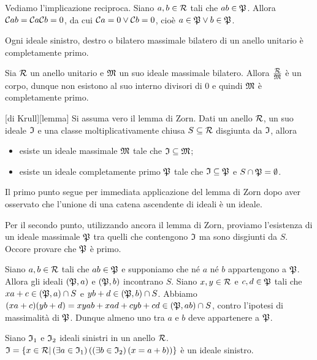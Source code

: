 \par Vediamo l'implicazione reciproca. Siano $a, b \in \mathcal{R}$ tali che $ab \in \mathfrak{P}$. Allora $\mathcal{C}{ab} = \mathcal{C}{a} \mathcal{C}{b} = 0$, da cui $\mathcal{C}{a} = 0 \vee \mathcal{C}{b} = 0$, cio\`e $a \in \mathfrak{P} \vee b \in \mathfrak{P}$. \EndProof
\begin{Theorem}
	Ogni ideale sinistro, destro o bilatero massimale bilatero di un anello unitario \`e completamente primo.
\end{Theorem}
\Proof Sia $\mathcal{R}$ un anello unitario e $\mathfrak{M}$ un suo ideale massimale bilatero. Allora $\frac{\mathcal{R}}{\mathfrak{M}}$ \`e un corpo, dunque non esistono al suo interno divisori di $0$ e quindi $\mathfrak{M}$ \`e completamente primo. \EndProof
\begin{Lemma}
	[di Krull][lemma] Si assuma vero il lemma di Zorn. Dati un anello $\mathcal{R}$, un suo ideale $\mathfrak{I}$ e una classe moltiplicativamente chiusa $S \subseteq \mathcal{R}$ disgiunta da $\mathfrak{I}$, allora
	\begin{itemize}
		\item esiste un ideale massimale $\mathfrak{M}$ tale che $\mathfrak{I} \subseteq \mathfrak{M}$;
		\item esiste un ideale completamente primo $\mathfrak{P}$ tale che $\mathfrak{I} \subseteq \mathfrak{P}$ e $S \cap \mathfrak{P} = \emptyset$.
	\end{itemize}
\end{Lemma}
\Proof Il primo punto segue per immediata applicazione del lemma di Zorn dopo aver osservato che l'unione di una catena ascendente di ideali \`e un ideale.
\par Per il secondo punto, utilizzando ancora il lemma di Zorn, proviamo l'esistenza di un ideale massimale $\mathfrak{P}$ tra quelli che contengono $\mathfrak{I}$ ma sono disgiunti da $S$. Occore provare che $\mathfrak{P}$ \`e primo.
\par Siano $a, b \in \mathcal{R}$ tali che $ab \in \mathfrak{P}$ e supponiamo che n\'e $a$ n\'e $b$ appartengono a $\mathfrak{P}$. Allora gli ideali $\left ( \mathfrak{P},a \right )$ e $\left ( \mathfrak{P},b \right )$ incontrano $S$. Siano $x, y \in \mathcal{R}$ e $c, d \in \mathfrak{P}$ tali che $xa + c \in \left ( \mathfrak{P},a \right ) \cap S$ e $yb + d \in \left ( \mathfrak{P},b \right ) \cap S$. Abbiamo $(xa + c)(yb + d) = xyab + xad + cyb + cd \in \left ( \mathfrak{P},ab \right ) \cap S$, contro l'ipotesi di massimalit\`a di $\mathfrak{P}$. Dunque almeno uno tra $a$ e $b$ deve appartenere a $\mathfrak{P}$.  \EndProof
\begin{Theorem}
	Siano $\mathfrak{I}_1$ e $\mathfrak{I}_2$ ideali sinistri in un anello $\mathcal{R}$. $\mathfrak{I} = \lbrace x \in \mathcal{R} | \left ( \exists a \in \mathfrak{I}_1 \right ) \left ( \left ( \exists b \in \mathfrak{I}_2 \right ) \left ( x = a + b \right ) \right ) \rbrace$ \`e un ideale sinistro.
\end{Theorem}
